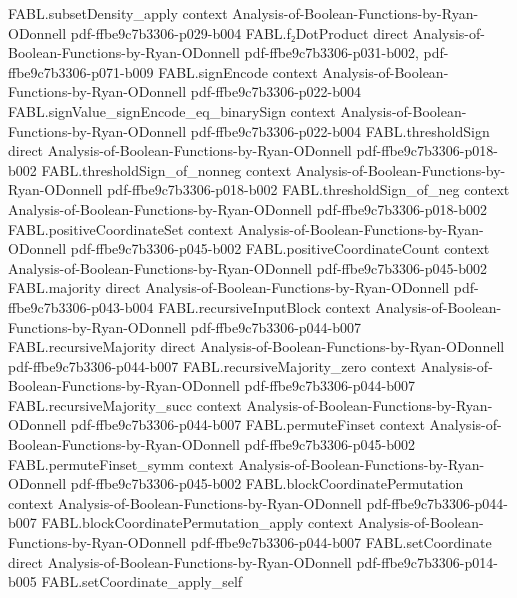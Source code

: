 \begin{theorem}
  {FABL.subsetDensity_apply}
  {context}
  {Analysis-of-Boolean-Functions-by-Ryan-ODonnell}
  {pdf-ffbe9c7b3306-p029-b004}
\proofstep
  {FABL.f₂DotProduct}
  {direct}
  {Analysis-of-Boolean-Functions-by-Ryan-ODonnell}
  {pdf-ffbe9c7b3306-p031-b002,
    pdf-ffbe9c7b3306-p071-b009}
\proofstep
  {FABL.signEncode}
  {context}
  {Analysis-of-Boolean-Functions-by-Ryan-ODonnell}
  {pdf-ffbe9c7b3306-p022-b004}
\proofstep
  {FABL.signValue_signEncode_eq_binarySign}
  {context}
  {Analysis-of-Boolean-Functions-by-Ryan-ODonnell}
  {pdf-ffbe9c7b3306-p022-b004}
\proofstep
  {FABL.thresholdSign}
  {direct}
  {Analysis-of-Boolean-Functions-by-Ryan-ODonnell}
  {pdf-ffbe9c7b3306-p018-b002}
\proofstep
  {FABL.thresholdSign_of_nonneg}
  {context}
  {Analysis-of-Boolean-Functions-by-Ryan-ODonnell}
  {pdf-ffbe9c7b3306-p018-b002}
\proofstep
  {FABL.thresholdSign_of_neg}
  {context}
  {Analysis-of-Boolean-Functions-by-Ryan-ODonnell}
  {pdf-ffbe9c7b3306-p018-b002}
\proofstep
  {FABL.positiveCoordinateSet}
  {context}
  {Analysis-of-Boolean-Functions-by-Ryan-ODonnell}
  {pdf-ffbe9c7b3306-p045-b002}
\proofstep
  {FABL.positiveCoordinateCount}
  {context}
  {Analysis-of-Boolean-Functions-by-Ryan-ODonnell}
  {pdf-ffbe9c7b3306-p045-b002}
\proofstep
  {FABL.majority}
  {direct}
  {Analysis-of-Boolean-Functions-by-Ryan-ODonnell}
  {pdf-ffbe9c7b3306-p043-b004}
\proofstep
  {FABL.recursiveInputBlock}
  {context}
  {Analysis-of-Boolean-Functions-by-Ryan-ODonnell}
  {pdf-ffbe9c7b3306-p044-b007}
\proofstep
  {FABL.recursiveMajority}
  {direct}
  {Analysis-of-Boolean-Functions-by-Ryan-ODonnell}
  {pdf-ffbe9c7b3306-p044-b007}
\proofstep
  {FABL.recursiveMajority_zero}
  {context}
  {Analysis-of-Boolean-Functions-by-Ryan-ODonnell}
  {pdf-ffbe9c7b3306-p044-b007}
\proofstep
  {FABL.recursiveMajority_succ}
  {context}
  {Analysis-of-Boolean-Functions-by-Ryan-ODonnell}
  {pdf-ffbe9c7b3306-p044-b007}
\proofstep
  {FABL.permuteFinset}
  {context}
  {Analysis-of-Boolean-Functions-by-Ryan-ODonnell}
  {pdf-ffbe9c7b3306-p045-b002}
\proofstep
  {FABL.permuteFinset_symm}
  {context}
  {Analysis-of-Boolean-Functions-by-Ryan-ODonnell}
  {pdf-ffbe9c7b3306-p045-b002}
\proofstep
  {FABL.blockCoordinatePermutation}
  {context}
  {Analysis-of-Boolean-Functions-by-Ryan-ODonnell}
  {pdf-ffbe9c7b3306-p044-b007}
\proofstep
  {FABL.blockCoordinatePermutation_apply}
  {context}
  {Analysis-of-Boolean-Functions-by-Ryan-ODonnell}
  {pdf-ffbe9c7b3306-p044-b007}
\proofstep
  {FABL.setCoordinate}
  {direct}
  {Analysis-of-Boolean-Functions-by-Ryan-ODonnell}
  {pdf-ffbe9c7b3306-p014-b005}
\proofstep
  {FABL.setCoordinate_apply_self}

\end{theorem}
